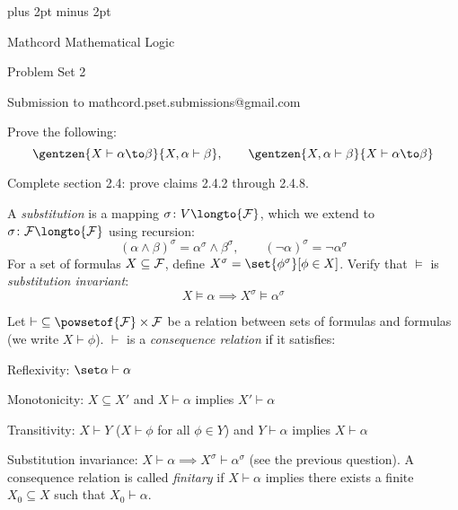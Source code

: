 

\parindent=0pt
\parskip=3pt plus 2pt minus 2pt



\centerline{Mathcord Mathematical Logic}
\centerline{Problem Set 2}
\centerline{Submission to mathcord.pset.submissions@gmail.com}

\bprob

    Prove the following:
    $$ \gentzen{X\vdash\alpha\to\beta}{X,\alpha\vdash\beta},\qquad
    \gentzen{X,\alpha\vdash\beta}{X\vdash\alpha\to\beta} $$

\eprob

\bprob

    Complete section 2.4: prove claims 2.4.2 through 2.4.8.

\eprob

\bprob

    A {\it substitution} is a mapping $\sigma\colon V\longto{\cal F}$, which we extend to
    $\sigma\colon{\cal F}\longto{\cal F}$ using recursion:
    $$ (\alpha\land\beta)^\sigma = \alpha^\sigma\land\beta^\sigma,\qquad
    (\neg\alpha)^\sigma = \neg\alpha^\sigma $$
    For a set of formulas $X\subseteq{\cal F}$, define $X^\sigma=\set{\phi^\sigma}[\phi\in X]$.
    Verify that $\vDash$ is {\it substitution invariant}:
    $$ X\vDash\alpha \implies X^\sigma\vDash\alpha^\sigma $$

\eprob

\bprob

    Let ${\vdash}\subseteq\powsetof{\cal F}\times{\cal F}$ be a relation between sets of formulas
    and formulas (we write $X\vdash\phi$).
    $\vdash$ is a {\it consequence relation} if it satisfies:
    \benum
        \item Reflexivity: $\set\alpha\vdash\alpha$
        \item Monotonicity: $X\subseteq X'$ and $X\vdash\alpha$ implies $X'\vdash\alpha$
        \item Transitivity: $X\vdash Y$ ($X\vdash\phi$ for all $\phi\in Y$) and $Y\vdash\alpha$
        implies $X\vdash\alpha$
        \item Substitution invariance: $X\vdash\alpha\implies X^\sigma\vdash\alpha^\sigma$ (see
        the previous question).
    \eenum
    A consequence relation is called {\it finitary} if $X\vdash\alpha$ implies there exists a
    finite $X_0\subseteq X$ such that $X_0\vdash\alpha$.

